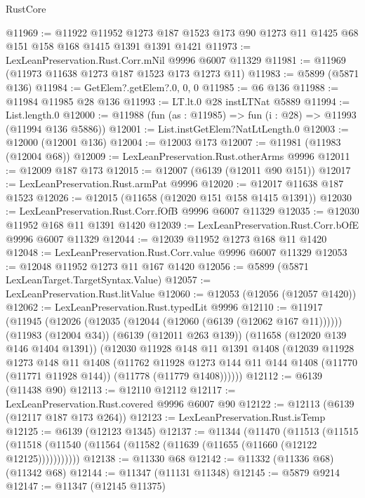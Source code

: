 \begin{lexlean}{RustCore}
\begin{coremodule}
@11969 := @11922
    @11952
    @1273
    @187
    @1523
    @173
    @90
    @1273
    @11
    @1425
    @68
    @151
    @158
    @168
    @1415
    @1391
    @1391
    @1421
@11973 := LexLeanPreservation.Rust.Corr.mNil @9996 @6007 @11329
@11981 := @11969 (@11973 @11638 @1273 @187 @1523 @173 @1273 @11)
@11983 := @5899 (@5871 @136)
@11984 := GetElem?.getElem?.{0, 0, 0}
@11985 := @6 @136
@11988 := @11984 @11985 @28 @136
@11993 := LT.lt.{0} @28 instLTNat @5889
@11994 := List.length.{0}
@12000 := @11988 (fun (as : @11985) => fun (i : @28) => @11993 (@11994 @136 @5886))
@12001 := List.instGetElem?NatLtLength.{0}
@12003 := @12000 (@12001 @136)
@12004 := @12003 @173
@12007 := @11981 (@11983 (@12004 @68))
@12009 := LexLeanPreservation.Rust.otherArms @9996
@12011 := @12009 @187 @173
@12015 := @12007 (@6139 (@12011 @90 @151))
@12017 := LexLeanPreservation.Rust.armPat @9996
@12020 := @12017 @11638 @187 @1523
@12026 := @12015 (@11658 (@12020 @151 @158 @1415 @1391))
@12030 := LexLeanPreservation.Rust.Corr.fOfB @9996 @6007 @11329
@12035 := @12030 @11952 @168 @11 @1391 @1420
@12039 := LexLeanPreservation.Rust.Corr.bOfE @9996 @6007 @11329
@12044 := @12039 @11952 @1273 @168 @11 @1420
@12048 := LexLeanPreservation.Rust.Corr.value @9996 @6007 @11329
@12053 := @12048 @11952 @1273 @11 @167 @1420
@12056 := @5899 (@5871 LexLeanTarget.TargetSyntax.Value)
@12057 := LexLeanPreservation.Rust.litValue
@12060 := @12053 (@12056 (@12057 @1420))
@12062 := LexLeanPreservation.Rust.typedLit @9996
@12110 := @11917
    (@11945
      (@12026 (@12035 (@12044 (@12060 (@6139 (@12062 @167 @11))))))
      (@11983 (@12004 @34))
      (@6139 (@12011 @263 @139))
      (@11658 (@12020 @139 @146 @1404 @1391))
      (@12030
        @11928
        @148
        @11
        @1391
        @1408
        (@12039
          @11928
          @1273
          @148
          @11
          @1408
          (@11762
            @11928
            @1273
            @144
            @11
            @144
            @1408
            (@11770 (@11771 @11928 @144))
            (@11778 (@11779 @1408))))))
@12112 := @6139 (@11438 @90)
@12113 := @12110 @12112
@12117 := LexLeanPreservation.Rust.covered @9996 @6007 @90
@12122 := @12113 (@6139 (@12117 @187 @173 @264))
@12123 := LexLeanPreservation.Rust.isTemp
@12125 := @6139 (@12123 @1345)
@12137 := @11344
    (@11470
      (@11513
        (@11515 (@11518 (@11540 (@11564 (@11582 (@11639 (@11655 (@11660 (@12122 @12125)))))))))))
@12138 := @11330 @68
@12142 := @11332 (@11336 @68) (@11342 @68)
@12144 := @11347 (@11131 @11348)
@12145 := @5879 @9214
@12147 := @11347 (@12145 @11375)

\end{coremodule}
\end{lexlean}
